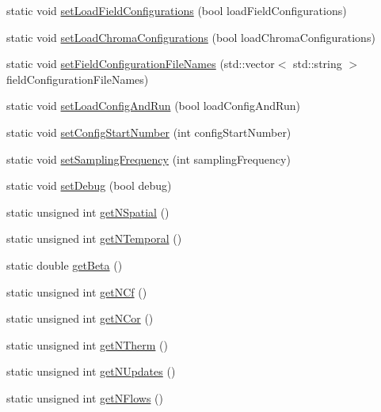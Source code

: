\begin{DoxyCompactItemize}
\item 
static void \mbox{\hyperlink{class_parameters_a4f96947340b496b847a808b8be6fc5f9}{set\+Load\+Field\+Configurations}} (bool load\+Field\+Configurations)
\item 
static void \mbox{\hyperlink{class_parameters_a632a2371d7b5d157df2dd42e7b6ab843}{set\+Load\+Chroma\+Configurations}} (bool load\+Chroma\+Configurations)
\item 
static void \mbox{\hyperlink{class_parameters_a4b1c5312603f90d04f1b6ed732528ae3}{set\+Field\+Configuration\+File\+Names}} (std\+::vector$<$ std\+::string $>$ field\+Configuration\+File\+Names)
\item 
static void \mbox{\hyperlink{class_parameters_aa7e911174ec1991f6750b9774b184fd3}{set\+Load\+Config\+And\+Run}} (bool load\+Config\+And\+Run)
\item 
static void \mbox{\hyperlink{class_parameters_a4863c437df48cd3242fdb67221a3d6ed}{set\+Config\+Start\+Number}} (int config\+Start\+Number)
\item 
static void \mbox{\hyperlink{class_parameters_ae9fa4bf77247404758c43179849ae3bf}{set\+Sampling\+Frequency}} (int sampling\+Frequency)
\item 
static void \mbox{\hyperlink{class_parameters_a6b0d9bf17b3c8096c3454d291e086ac2}{set\+Debug}} (bool debug)
\item 
static unsigned int \mbox{\hyperlink{class_parameters_a52b90e94a378ec9fe8c504cf546e98fa}{get\+N\+Spatial}} ()
\item 
static unsigned int \mbox{\hyperlink{class_parameters_a237ea1286459e8c648e983464829fe8d}{get\+N\+Temporal}} ()
\item 
static double \mbox{\hyperlink{class_parameters_ae5c64523dc50dca13b417fe3d9e4175c}{get\+Beta}} ()
\item 
static unsigned int \mbox{\hyperlink{class_parameters_a03f8c0aa2a31b9bfc016441cb263082c}{get\+N\+Cf}} ()
\item 
static unsigned int \mbox{\hyperlink{class_parameters_a0fd902d5efcd8dce17dbc3ea4177820d}{get\+N\+Cor}} ()
\item 
static unsigned int \mbox{\hyperlink{class_parameters_ad1f56cc1bb6c19f40454b30a5bc82da6}{get\+N\+Therm}} ()
\item 
static unsigned int \mbox{\hyperlink{class_parameters_ac10d294b56c295bdc7e8ea4fdccb917e}{get\+N\+Updates}} ()
\item 
static unsigned int \mbox{\hyperlink{class_parameters_aae314edb18d426571ab7b6df60da70aa}{get\+N\+Flows}} ()
\item 

\end{DoxyCompactItemize}
